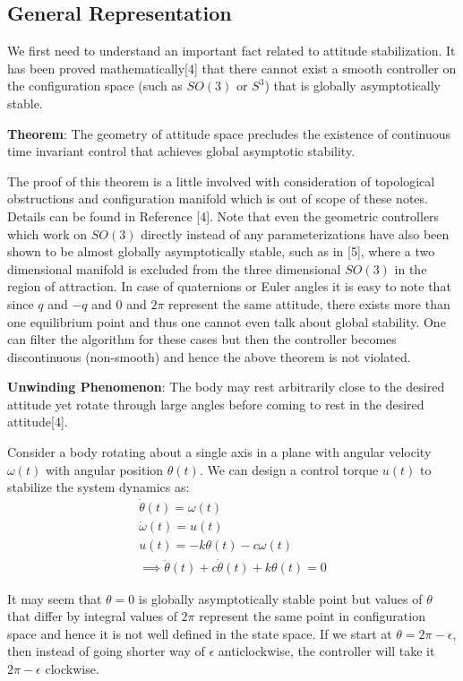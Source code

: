 \documentclass{article}
\begin{document}
		\subsection{General Representation}
	
	We first need to understand an important fact related to attitude stabilization. It has been proved mathematically[4] that there cannot exist a smooth controller on the configuration space (such as $SO(3)$ or $S^3$) that is globally asymptotically stable. 
	
	\textbf{Theorem}: The geometry of attitude space precludes the existence of continuous time invariant control that achieves global asymptotic stability.
	
	The proof of this theorem is a little involved with consideration of topological obstructions and configuration manifold which is out of scope of these notes. Details can be found in Reference [4]. Note that even the geometric controllers which work on $SO(3)$ directly instead of any parameterizations have also been shown to be almost globally asymptotically stable, such as in [5], where a two dimensional manifold is excluded from the three dimensional $SO(3)$ in the region of attraction. In case of quaternions or Euler angles it is easy to note that since $q$ and $-q$ and $0$ and $2\pi$ represent the same attitude, there exists more than one equilibrium point and thus one cannot even talk about global stability. One can filter the algorithm for these cases but then the controller becomes discontinuous (non-smooth) and hence the above theorem is not violated.
	
		\textbf{Unwinding Phenomenon}: The body may rest arbitrarily close to the desired attitude yet rotate through large angles before coming to rest in the desired attitude[4].
		
		Consider a body rotating about a single axis in a plane with angular velocity $\omega(t)$ with angular position $\theta(t)$. We can design a control torque $u(t)$ to stabilize the system dynamics as:
		\begin{eqnarray}
			\dot{\theta}(t) = \omega(t)\\
			\dot{\omega}(t) = u(t)\\
			u(t) = -k\theta(t) - c\omega(t)\\
			\implies \ddot{\theta}(t) + c\dot{\theta}(t) + k\theta(t) = 0
		\end{eqnarray}
		
		It may seem that $\theta=0$ is globally asymptotically stable point but values of $\theta$ that differ by integral values of $2\pi$ represent the same point in configuration space and hence it is not well defined in the state space. If we start at $\theta=2\pi-\epsilon$, then instead of going shorter way of $\epsilon$ anticlockwise, the controller will take it $2\pi-\epsilon$ clockwise.
	
\end{document}
